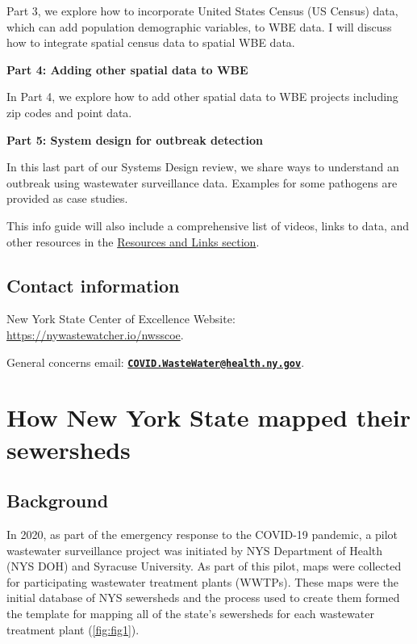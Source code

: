 \documentclass[
]{book}
\begin{document}
Part 3, we explore how to incorporate United States Census (US Census) data, which can add population demographic variables, to WBE data. I will discuss how to integrate spatial census data to spatial WBE data.

\textbf{Part 4: Adding other spatial data to WBE}

In Part 4, we explore how to add other spatial data to WBE projects including zip codes and point data.

\textbf{Part 5: System design for outbreak detection}

In this last part of our Systems Design review, we share ways to understand an outbreak using wastewater surveillance data. Examples for some pathogens are provided as case studies.

This info guide will also include a comprehensive list of videos, links to data, and other resources in the \protect\hyperlink{07-resources-and-links}{Resources and Links section}.

\hypertarget{contact-information}{%
\section{Contact information}\label{contact-information}}

New York State Center of Excellence Website: \url{https://nywastewatcher.io/nwsscoe}.

General concerns email: \textbf{\href{mailto:COVID.WasteWater@health.ny.gov}{\nolinkurl{COVID.WasteWater@health.ny.gov}}}.

\hypertarget{how-new-york-state-mapped-their-sewersheds}{%
\chapter{How New York State mapped their sewersheds}\label{how-new-york-state-mapped-their-sewersheds}}

\hypertarget{background}{%
\section{Background}\label{background}}

In 2020, as part of the emergency response to the COVID-19 pandemic, a pilot wastewater surveillance project was initiated by NYS Department of Health (NYS DOH) and Syracuse University. As part of this pilot, maps were collected for participating wastewater treatment plants (WWTPs). These maps were the initial database of NYS sewersheds and the process used to create them formed the template for mapping all of the state's sewersheds for each wastewater treatment plant (\ref{fig:fig1}).
\end{document}
